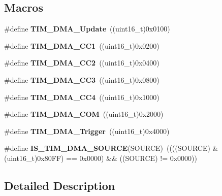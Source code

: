 \subsection*{Macros}
\begin{DoxyCompactItemize}
\item 
\mbox{\label{group___t_i_m___d_m_a__sources_ga013a49e5cceb263f01941aef968dea9c}} 
\#define {\bfseries T\+I\+M\+\_\+\+D\+M\+A\+\_\+\+Update}~((uint16\+\_\+t)0x0100)
\item 
\mbox{\label{group___t_i_m___d_m_a__sources_ga33b93e8bb82fe8e167b9e9c962c54f83}} 
\#define {\bfseries T\+I\+M\+\_\+\+D\+M\+A\+\_\+\+C\+C1}~((uint16\+\_\+t)0x0200)
\item 
\mbox{\label{group___t_i_m___d_m_a__sources_ga792f73196a8e7424655592097d7a3fd5}} 
\#define {\bfseries T\+I\+M\+\_\+\+D\+M\+A\+\_\+\+C\+C2}~((uint16\+\_\+t)0x0400)
\item 
\mbox{\label{group___t_i_m___d_m_a__sources_ga3eb2dadbd3109bced45935fb53deeee1}} 
\#define {\bfseries T\+I\+M\+\_\+\+D\+M\+A\+\_\+\+C\+C3}~((uint16\+\_\+t)0x0800)
\item 
\mbox{\label{group___t_i_m___d_m_a__sources_ga59495cf79894dfe5e5b2029863aed956}} 
\#define {\bfseries T\+I\+M\+\_\+\+D\+M\+A\+\_\+\+C\+C4}~((uint16\+\_\+t)0x1000)
\item 
\mbox{\label{group___t_i_m___d_m_a__sources_gac5f4c56e944bda8ba0c23b97275020ba}} 
\#define {\bfseries T\+I\+M\+\_\+\+D\+M\+A\+\_\+\+C\+OM}~((uint16\+\_\+t)0x2000)
\item 
\mbox{\label{group___t_i_m___d_m_a__sources_ga81ad169a378969524e61396337d84a0a}} 
\#define {\bfseries T\+I\+M\+\_\+\+D\+M\+A\+\_\+\+Trigger}~((uint16\+\_\+t)0x4000)
\item 
\mbox{\label{group___t_i_m___d_m_a__sources_gafb9cb1995ea4cd37db6032d80a49cd47}} 
\#define {\bfseries I\+S\+\_\+\+T\+I\+M\+\_\+\+D\+M\+A\+\_\+\+S\+O\+U\+R\+CE}(S\+O\+U\+R\+CE)~((((S\+O\+U\+R\+CE) \& (uint16\+\_\+t)0x80\+F\+F) == 0x0000) \&\& ((\+S\+O\+U\+R\+C\+E) != 0x0000))
\end{DoxyCompactItemize}


\subsection{Detailed Description}
